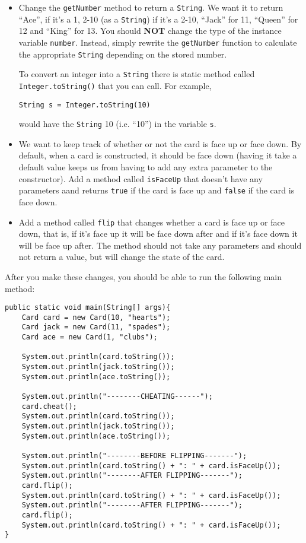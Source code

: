 \documentclass[11pt]{article}
\begin{document}
\begin{itemize}

\item Change the \texttt{getNumber} method to return a \texttt{String}.  We want it to return ``Ace'', if it's a 1, 2-10 (as a \texttt{String}) if it's a 2-10, ``Jack'' for 11, ``Queen'' for 12 and ``King'' for 13.  You should \textbf{NOT} change the type of the instance variable \texttt{number}.  Instead, simply rewrite the \texttt{getNumber} function to calculate the appropriate \texttt{String} depending on the stored number.

To convert an integer into a \texttt{String} there is static method called \texttt{Integer.toString()} that you can call.  For example,

\begin{verbatim}
String s = Integer.toString(10)
\end{verbatim}

would have the \texttt{String} 10 (i.e. ``10'') in the variable \texttt{s}.

\item We want to keep track of whether or not the card is face up or face down.  By default, when a card is constructed, it should be face down (having it take a default value keeps us from having to add any extra parameter to the constructor).  Add a method called \texttt{isFaceUp} that doesn't have any parameters aand returns \texttt{true} if the card is face up and \texttt{false} if the card is face down.

\item Add a method called \texttt{flip} that changes whether a card is face up or face down, that is, if it's face up it will be face down after and if it's face down it will be face up after.  The method should not take any parameters and should not return a value, but will change the state of the card.

\end{itemize}

After you make these changes, you should be able to run the following main method:

\begin{verbatim}
public static void main(String[] args){
    Card card = new Card(10, "hearts");
    Card jack = new Card(11, "spades");
    Card ace = new Card(1, "clubs");
		
    System.out.println(card.toString());
    System.out.println(jack.toString());
    System.out.println(ace.toString());
				
    System.out.println("--------CHEATING------");
    card.cheat();
    System.out.println(card.toString());
    System.out.println(jack.toString());
    System.out.println(ace.toString());
		
    System.out.println("--------BEFORE FLIPPING-------");
    System.out.println(card.toString() + ": " + card.isFaceUp());
    System.out.println("--------AFTER FLIPPING-------");
    card.flip();
    System.out.println(card.toString() + ": " + card.isFaceUp());
    System.out.println("--------AFTER FLIPPING-------");
    card.flip();
    System.out.println(card.toString() + ": " + card.isFaceUp());
}
\end{verbatim}
\end{document}
